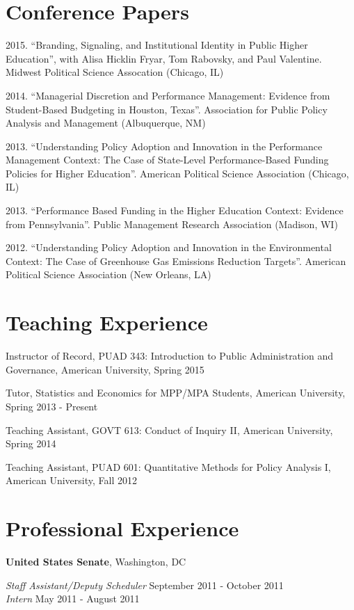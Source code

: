 \documentclass[margin,line]{res}
\begin{document}
\begin{resume}
\section{\sc Conference Papers}
2015. ``Branding, Signaling, and Institutional Identity in Public Higher Education'', with Alisa Hicklin Fryar, Tom Rabovsky, and Paul Valentine. Midwest Political Science Assocation (Chicago, IL)

2014.  ``Managerial Discretion and Performance Management: Evidence from Student-Based Budgeting in Houston, Texas''. Association for Public Policy Analysis and Management (Albuquerque, NM)

2013.  ``Understanding Policy Adoption and Innovation in the Performance Management Context: The Case of State-Level Performance-Based Funding Policies for Higher Education''. American Political Science Association (Chicago, IL)

2013. ``Performance Based Funding in the Higher Education Context: Evidence from Pennsylvania''. Public Management Research Association (Madison, WI)

2012. ``Understanding Policy Adoption and Innovation in the Environmental Context: The Case of Greenhouse Gas Emissions Reduction Targets''. American Political Science Association (New Orleans, LA)


\section{\sc Teaching Experience}
Instructor of Record, PUAD 343: Introduction to Public Administration and Governance, American University, Spring 2015

Tutor, Statistics and Economics for MPP/MPA Students, American University, Spring 2013 - Present

Teaching Assistant, GOVT 613: Conduct of Inquiry II, American University, Spring 2014

Teaching Assistant, PUAD 601: Quantitative Methods for Policy Analysis I, American University, Fall 2012

\section{\sc Professional Experience}
{\bf United States Senate}, Washington, DC

\vspace{-.3cm}
{\em Staff Assistant/Deputy Scheduler} \hfill September 2011 - October 2011\\
{\em Intern} \hfill May 2011 - August 2011


\end{resume}
\end{document}
